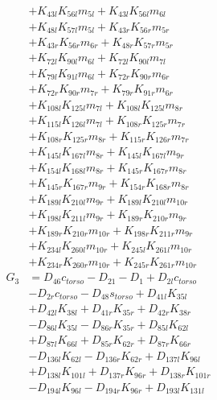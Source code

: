 \begin{multicols}{2}
\begin{align}
&+ K_{43l}K_{56l}m_{5l} + K_{43l}K_{56l}m_{6l}  \nonumber \\
&+ K_{48l}K_{57l}m_{5l} + K_{43r}K_{56r}m_{5r}  \nonumber \\
&+ K_{43r}K_{56r}m_{6r} + K_{48r}K_{57r}m_{5r}  \nonumber \\
&+ K_{72l}K_{90l}m_{6l} + K_{72l}K_{90l}m_{7l}  \nonumber \\
&+ K_{79l}K_{91l}m_{6l} + K_{72r}K_{90r}m_{6r}  \nonumber \\
&+ K_{72r}K_{90r}m_{7r} + K_{79r}K_{91r}m_{6r}  \nonumber \\
&+ K_{108l}K_{125l}m_{7l} + K_{108l}K_{125l}m_{8r}  \nonumber \\
&+ K_{115l}K_{126l}m_{7l} + K_{108r}K_{125r}m_{7r}  \nonumber \\
&+ K_{108r}K_{125r}m_{8r} + K_{115r}K_{126r}m_{7r}  \nonumber \\
&+ K_{145l}K_{167l}m_{8r} + K_{145l}K_{167l}m_{9r}  \nonumber \\
&+ K_{154l}K_{168l}m_{8r} + K_{145r}K_{167r}m_{8r}  \nonumber \\
&+ K_{145r}K_{167r}m_{9r} + K_{154r}K_{168r}m_{8r}  \nonumber \\
&+ K_{189l}K_{210l}m_{9r} + K_{189l}K_{210l}m_{10r}  \nonumber \\
&+ K_{198l}K_{211l}m_{9r} + K_{189r}K_{210r}m_{9r}  \nonumber \\
&+ K_{189r}K_{210r}m_{10r} + K_{198r}K_{211r}m_{9r}  \nonumber \\
&+ K_{234l}K_{260l}m_{10r} + K_{245l}K_{261l}m_{10r}  \nonumber \\
&+ K_{234r}K_{260r}m_{10r} + K_{245r}K_{261r}m_{10r} \nonumber \\
G_{3} &= D_{46}c_{torso} - D_{21} - D_{1} + D_{2l}c_{torso}  \nonumber \\
&- D_{2r}c_{torso} - D_{48}s_{torso} + D_{41l}K_{35l}  \nonumber \\
&+ D_{42l}K_{38l} + D_{41r}K_{35r} + D_{42r}K_{38r}  \nonumber \\
&- D_{86l}K_{35l} - D_{86r}K_{35r} + D_{85l}K_{62l}  \nonumber \\
&+ D_{87l}K_{66l} + D_{85r}K_{62r} + D_{87r}K_{66r}  \nonumber \\
&- D_{136l}K_{62l} - D_{136r}K_{62r} + D_{137l}K_{96l}  \nonumber \\
&+ D_{138l}K_{101l} + D_{137r}K_{96r} + D_{138r}K_{101r}  \nonumber \\
&- D_{194l}K_{96l} - D_{194r}K_{96r} + D_{193l}K_{131l}  \nonumber \\

\end{align}
\end{multicols}
